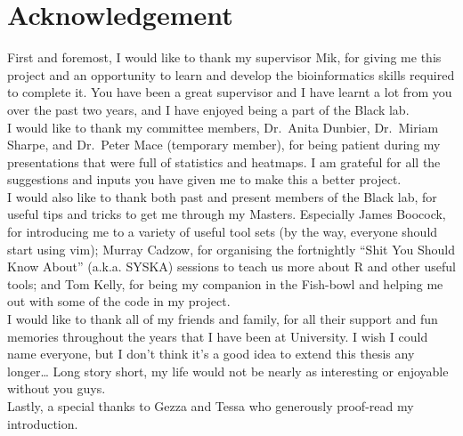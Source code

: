 
\vspace*{\fill}

\section*{\centering Acknowledgement}

First and foremost, I would like to thank my supervisor Mik, for giving me this project and an
opportunity to learn and develop the bioinformatics skills required to complete it.
You have been a great supervisor and I have learnt a lot from you over the past two years, and I have enjoyed being a part of the Black lab.
\\

\noindent
I would like to thank my committee members, Dr.\ Anita Dunbier, Dr.\ Miriam Sharpe, and Dr.\ Peter Mace (temporary member), for being patient during my presentations that were full of statistics and heatmaps.
I am grateful for all the suggestions and inputs you have given me to make this a better project.
\\

\noindent
I would also like to thank both past and present members of the Black lab, for useful tips and tricks to get me through my Masters.
Especially James Boocock, for introducing me to a variety of useful tool sets (by the way, everyone should start using vim); Murray Cadzow, for organising the fortnightly ``Shit You Should Know About'' (a.k.a. SYSKA) sessions to teach us more about R and other useful tools; and Tom Kelly, for being my companion in the Fish-bowl and helping me out with some of the code in my project.
\\

\noindent
I would like to thank all of my friends and family, for all their support and fun memories throughout the years that I have been at University.
I wish I could name everyone, but I don't think it's a good idea to extend this thesis any longer\ldots{}
Long story short, my life would not be nearly as interesting or enjoyable without you guys.
\\

\noindent
Lastly, a special thanks to Gezza and Tessa who generously proof-read my introduction.
\\

\vfill


